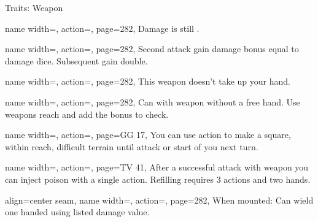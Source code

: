 \begin{PageBack}
\begin{Tables}{\backTableHeight}
\begin{Table}{Traits: Weapon}
\begin{entry}{}{%
                name width=\conditionLength,%
                action=\Finesse,
                page=282,
            }
                Damage is still \Strength.
            \end{entry}
            \begin{entry}{}{%
                name width=\conditionLength,%
                action=\Forceful,
                page=282,
            }
                Second attack gain \Cirm damage bonus equal to damage dice.
                Subsequent gain double.
            \end{entry}
            \begin{entry}{}{%
                name width=\conditionLength,%
                action=\FreeHand,
                page=282,
            }
                This weapon doesn't take up your hand.\hfill
            \end{entry}
            \breakLine
            \begin{entry}{}{%
                name width=\conditionLength,%
                action=\Grapple,
                page=282,
            }
                Can  with weapon without a free hand.
                Use weapons reach and add the \Item bonus to check. \hfill
            \end{entry}
            \breakLine
            \begin{entry}{}{%
                name width=\conditionLength,%
                action=\Hampering,
                page=GG 17,
            }
                You can use  action to make a square, within reach, difficult terrain until attack or start of you next turn.
            \end{entry}
            \breakLine
            \begin{entry}{}{%
                name width=\conditionLength,%
                action=\Injection,
                page=TV 41,
            }
                After a successful attack with weapon you can inject poison with a single  action. \hfill
                Refilling requires 3  actions and two hands.
            \end{entry}
            \breakLine
            \begin{entry}{}{%
                align=center seam,
                name width=\conditionLength,%
                action=\Jousting,
                page=282,
            }
                When mounted: Can wield one handed using listed damage value. \hfill
                \\

\end{entry}
\end{Table}
\end{Tables}
\end{PageBack}
